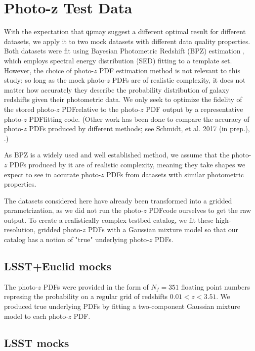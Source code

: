 \documentclass[\docopts]{\docclass}
\newcommand{\qp}{\texttt{qp}}
\newcommand{\pz}{photo-$z$ PDF}
\begin{document}
\section{Photo-z Test Data}
\label{sec:data}

With the expectation that \qp may suggest a different optimal result for 
different datasets, we apply it to two mock datasets with different data 
quality properties.  Both datasets were fit using Bayesian Photometric Redshift 
(BPZ) estimation \citep{benitez_bayesian_2000}, which employs spectral energy 
distribution (SED) fitting to a template set.  However, the choice of \pz  
estimation method is not relevant to this study; so long as the mock \pz s are 
of realistic complexity, it does not matter how accurately they describe the 
probability distribution of galaxy redshifts given their photometric data.  We 
only seek to optimize the fidelity of the stored \pz  relative to the \pz  
output by a representative \pz  fitting code.  (Other work has been done to 
compare the accuracy of \pz s produced by different methods; see Schmidt, et 
al. 2017 (in prep.), \citet{tanaka_photometric_2017}.)

As BPZ is a widely used and well established method, we assume that the \pz s 
produced by it are of realistic complexity, meaning they take shapes we expect 
to see in accurate \pz s from datasets with similar photometric properties.

The datasets considered here have already been transformed into a gridded 
parametrization, as we did not run the \pz  code ourselves to get the raw 
output.  To create a realistically complex testbed catalog, we fit these 
high-resolution, gridded \pz s with a Gaussian mixture model so that our 
catalog has a notion of "true" underlying \pz s.

\subsection{LSST+Euclid mocks}
\label{sec:mg}


The \pz s were provided in the form of $N_{f}=351$ floating point numbers 
represing the probability on a regular grid of redshifts $0.01 < z < 3.51$.  We 
produced true underlying PDFs by fitting a two-component Gaussian mixture model 
to each \pz .

\subsection{LSST mocks}
\label{sec:ss}
\end{document}
